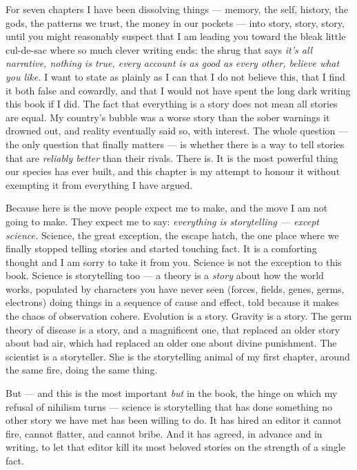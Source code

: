 For seven chapters I have been dissolving things — memory, the self, history, the gods, the patterns we trust, the money in our pockets — into story, story, story, until you might reasonably suspect that I am leading you toward the bleak little cul-de-sac where so much clever writing ends: the shrug that says \emph{it's all narrative, nothing is true, every account is as good as every other, believe what you like.} I want to state as plainly as I can that I do not believe this, that I find it both false and cowardly, and that I would not have spent the long dark writing this book if I did. The fact that everything is a story does not mean all stories are equal. My country's bubble was a worse story than the sober warnings it drowned out, and reality eventually said so, with interest. The whole question — the only question that finally matters — is whether there is a way to tell stories that are \emph{reliably better} than their rivals. There is. It is the most powerful thing our species has ever built, and this chapter is my attempt to honour it without exempting it from everything I have argued.

Because here is the move people expect me to make, and the move I am not going to make. They expect me to say: \emph{everything is storytelling — except science.} Science, the great exception, the escape hatch, the one place where we finally stopped telling stories and started touching fact. It is a comforting thought and I am sorry to take it from you. Science is not the exception to this book. Science is storytelling too — a theory is a \emph{story} about how the world works, populated by characters you have never seen (forces, fields, genes, germs, electrons) doing things in a sequence of cause and effect, told because it makes the chaos of observation cohere. Evolution is a story. Gravity is a story. The germ theory of disease is a story, and a magnificent one, that replaced an older story about bad air, which had replaced an older one about divine punishment. The scientist is a storyteller. She is the storytelling animal of my first chapter, around the same fire, doing the same thing.

But — and this is the most important \emph{but} in the book, the hinge on which my refusal of nihilism turns — science is storytelling that has done something no other story we have met has been willing to do. It has hired an editor it cannot fire, cannot flatter, and cannot bribe. And it has agreed, in advance and in writing, to let that editor kill its most beloved stories on the strength of a single fact.

